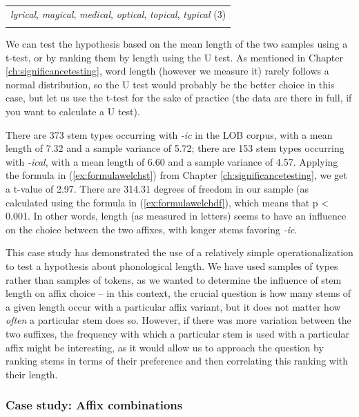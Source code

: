 \begin{table}[!htbp]
{\begin{tabular}[t]{l}
{\begin{minipage}[t]{\textwidth}
\textit{lyrical}, \textit{magical}, \textit{medical}, \textit{optical}, \textit{topical}, \textit{typical} (3)
\end{minipage}} \\
\lspbottomrule
\end{tabular}}
\end{table}

We can test the hypothesis based on the mean length of the two samples using a t-test, or by ranking them by length using the U test. As mentioned in Chapter \ref{ch:significancetesting}, word length (however we measure it) rarely follows a normal distribution, so the U test would probably be the better choice in this case, but let us use the t-test for the sake of practice (the data are there in full, if you want to calculate a U test).

There are 373 stem types occurring with \textit{-ic} in the LOB corpus, with a mean length of 7.32 and a sample variance of 5.72; there are 153 stem types occurring with \textit{-ical}, with a mean length of 6.60 and a sample variance of 4.57. Applying the formula in (\ref{ex:formulawelchst}) from Chapter \ref{ch:significancetesting}, we get a t-value of 2.97. There are 314.31 degrees of freedom in our sample (as calculated using the formula in (\ref{ex:formulawelchdf}), which means that p < 0.001. In other words, length (as measured in letters) seems to have an influence on the choice between the two affixes, with longer stems favoring \textit{-ic}.

This case study has demonstrated the use of a relatively simple operationalization to test a hypothesis about phonological length. We have used samples of types rather than samples of tokens, as we wanted to determine the influence of stem length on affix choice -- in this context, the crucial question is how many stems of a given length occur with a particular affix variant, but it does not matter how \textit{often} a particular stem does so. However, if there was more variation between the two suffixes, the frequency with which a particular stem is used with a particular affix might be interesting, as it would allow us to approach the question by ranking stems in terms of their preference and then correlating this ranking with their length.

\subsubsection{Case study: Affix combinations}
\label{sec:affixcombinations}

